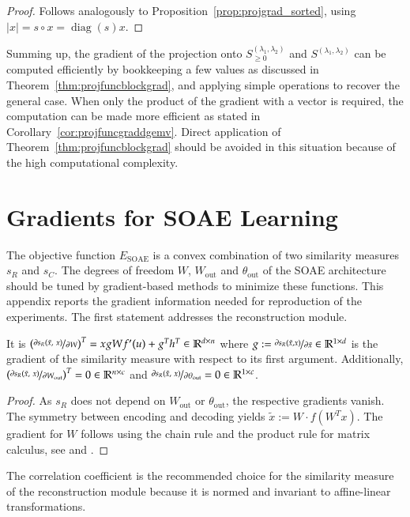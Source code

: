 \documentclass[twoside,11pt]{article}
\DeclareMathOperator{\hada}{\circ}
\DeclareMathOperator{\diag}{diag}
\DeclareMathOperator{\SOAE}{SOAE}
\DeclareMathOperator{\out}{out}
\newcommand{\R}{\mathbb{R}}
\newcommand{\0}{\mathcal{O}}
\newcommand{\transp}{^T}
\newcommand{\abs}[1]{\left\vert #1 \right\vert}
\begin{document}
\begin{proof}
Follows analogously to Proposition~\ref{prop:projgrad_sorted}, using $\abs{x} = s\hada x = \diag(s)x$.
\end{proof}
Summing up, the gradient of the projection onto $S_{\geq 0}^{(\lambda_1,\lambda_2)}$ and $S^{(\lambda_1,\lambda_2)}$ can be computed efficiently by bookkeeping a few values as discussed in Theorem~\ref{thm:projfuncblockgrad}, and applying simple operations to recover the general case.
When only the product of the gradient with a vector is required, the computation can be made more efficient as stated in Corollary~\ref{cor:projfuncgraddgemv}.
Direct application of Theorem~\ref{thm:projfuncblockgrad} should be avoided in this situation because of the high computational complexity.

\section{Gradients for SOAE Learning}
\label{sect:soae_gradients}
The objective function $E_{\SOAE}$ is a convex combination of two similarity measures $s_R$ and $s_C$.
The degrees of freedom $W$, $W_{\out}$ and $\theta_{\out}$ of the SOAE architecture should be tuned by gradient-based methods to minimize these functions.
This appendix reports the gradient information needed for reproduction of the experiments.
The first statement addresses the reconstruction module.
\begin{proposition}
\label{prop:SOAE-grad-reconst}
It is $\left(\nicefrac{\partial s_R\left(\tilde{x},\ x\right)}{\partial W}\right)\transp = xgW f'(u) + g\transp h\transp\in\R^{d\times n}$ where $g := \nicefrac{\partial s_R(\tilde{x}, x)}{\partial \tilde{x}}\in\R^{1\times d}$ is the gradient of the similarity measure with respect to its first argument.
Additionally, $\left(\nicefrac{\partial s_R\left(\tilde{x},\ x\right)}{\partial W_{\out}}\right)\transp = 0\in\R^{n\times c}$ and $\nicefrac{\partial s_R\left(\tilde{x},\ x\right)}{\partial \theta_{\out}} = 0\in\R^{1\times c}$.
\end{proposition}
\begin{proof}
As $s_R$ does not depend on $W_{\out}$ or $\theta_{\out}$, the respective gradients vanish.
The symmetry between encoding and decoding yields $\tilde{x} := W\cdot f\left(W\transp x\right)$.
The gradient for $W$ follows using the chain rule and the product rule for matrix calculus, see \citet{Neudecker1969} and \citet{Vetter1970}.
\end{proof}
The correlation coefficient is the recommended choice for the similarity measure of the reconstruction module because it is normed and invariant to affine-linear transformations.
\end{document}
